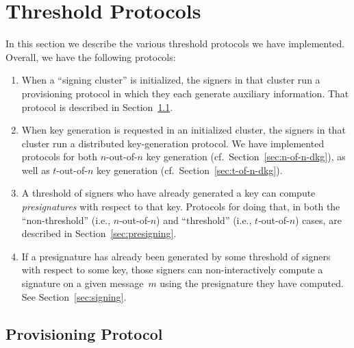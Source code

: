 \documentclass[11pt]{article}
\newcommand{\ignore}[1]{}
\newcommand{\?}[1]{\stackrel{?}{#1}}
\begin{document}
\section{Threshold Protocols}

In this section we describe the various threshold protocols we have implemented. 
Overall, we have the following protocols:
\begin{enumerate}
    \item When a ``signing cluster'' is initialized, the signers in that cluster run a provisioning protocol in which they each generate auxiliary information. That protocol is described in Section~\ref{section:aux_data_gen}. 

    \item When key generation is requested in an initialized cluster, the signers in that cluster run a distributed key-generation protocol. 
    We have implemented protocols for both $n$-out-of-$n$ key generation (cf.\ Section~\ref{sec:n-of-n-dkg}), as well as $t$-out-of-$n$ key  generation (cf.\ Section~\ref{sec:t-of-n-dkg}).

    \item A threshold of signers who have already generated a key can compute \emph{presignatures} with respect to that key. Protocols for doing that, in both the ``non-threshold'' (i.e., $n$-out-of-$n$) and ``threshold'' (i.e., $t$-out-of-$n$) cases, are described in Section~\ref{sec:presigning}.

    \item If a presignature has already been generated by some threshold of signers with respect to some key, those signers can non-interactively compute a signature on a given message~$m$ using the presignature they have computed. See Section~\ref{sec:signing}.
\end{enumerate}

\ignore{We have also implemented a protocol for $n$-out-of-$n$ key refresh that refreshes the shares associated with some key.
Since we have not yet implemented a $t$-out-of-$n$ version of key refresh, and do not currently use key refresh in production, we have deferred a description of that protocol to
 Appendix~\ref{sec:refresh}.
(Note that when key refresh is used in some signing cluster, one should probably do a key refresh for \emph{all} the keys stored by that  cluster, and should also re-run the provisioning protocol for that cluster.)
}

\subsection{Provisioning Protocol}
\label{section:aux_data_gen}
\end{document}
